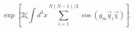 \begin{equation}
\label{III}
\exp\left[2\zeta\int d^3x
\sum\limits_{i=1}^{N(N-1)/2}
\cos\left(g_m\vec q_i\vec\chi\right)\right].
\end{equation}

